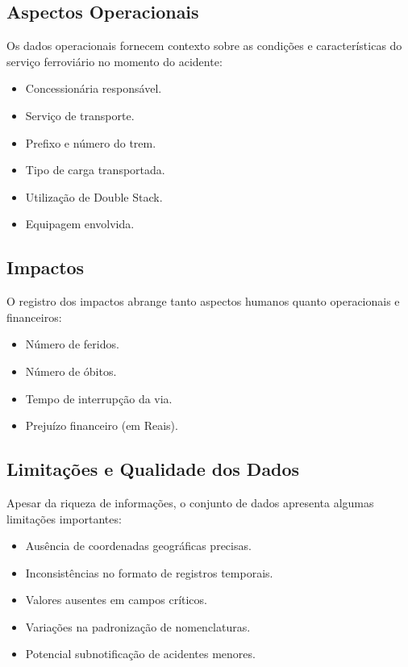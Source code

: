 \documentclass[conference]{IEEEtran}
\begin{document}
\subsection{Aspectos Operacionais}
Os dados operacionais fornecem contexto sobre as condições e características do serviço ferroviário no momento do acidente:

\begin{itemize}
\item Concessionária responsável.
\item Serviço de transporte.
\item Prefixo e número do trem.
\item Tipo de carga transportada.
\item Utilização de Double Stack.
\item Equipagem envolvida.
\end{itemize}

\subsection{Impactos}
O registro dos impactos abrange tanto aspectos humanos quanto operacionais e financeiros:

\begin{itemize}
\item Número de feridos.
\item Número de óbitos.
\item Tempo de interrupção da via.
\item Prejuízo financeiro (em Reais).
\end{itemize}

\subsection{Limitações e Qualidade dos Dados}
Apesar da riqueza de informações, o conjunto de dados apresenta algumas limitações importantes:

\begin{itemize}
\item Ausência de coordenadas geográficas precisas.
\item Inconsistências no formato de registros temporais.
\item Valores ausentes em campos críticos.
\item Variações na padronização de nomenclaturas.
\item Potencial subnotificação de acidentes menores.
\end{itemize}
\end{document}
